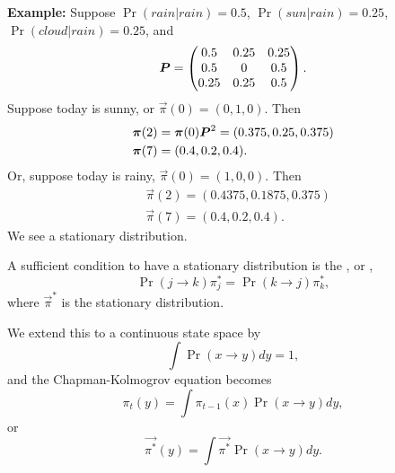 \documentclass[thesis.tex]{subfiles}
\begin{document}
\noindent\textbf{Example:} Suppose \(\Pr(rain | rain) = 0.5\), \(\Pr(sun | rain) = 0.25\), \(\Pr(cloud | rain) = 0.25\), and \[
	\boldsymbol{P} = \begin{pmatrix}
		0.5 & 0.25 & 0.25 \\
		0.5 & 0 & 0.5 \\
		0.25 & 0.25 & 0.5
	\end{pmatrix}.
\] Suppose today is sunny, or \(\vec{\pi}(0) = (0, 1, 0)\). Then \begin{equation}\begin{aligned}
	&\boldsymbol{\pi}(2) = \boldsymbol{\pi}(0) \boldsymbol{P}^2 = (0.375, 0.25, 0.375) \\
	&\boldsymbol{\pi}(7) = (0.4, 0.2, 0.4).
\end{aligned}\end{equation} Or, suppose today is rainy, \(\vec{\pi}(0) = (1, 0, 0)\). Then \begin{equation}\begin{aligned}
	&\vec{\pi}(2) = (0.4375, 0.1875, 0.375) \\
	&\vec{\pi}(7) = (0.4, 0.2, 0.4).
\end{aligned}\end{equation} We see a stationary distribution.

\bigskip

\begin{comment}Also, a Markov chain is irreducible, aperiodic, and positive recurrent has a stationary distribution (prove?).
\end{comment}

A sufficient condition to have a stationary distribution is the , or , \[
	\Pr(j \to k)\pi_j^* = \Pr(k \to j)\pi_k^*,
\] where \(\vec{\pi}^*\) is the stationary distribution.

\begin{comment}
	\textbf{Claim:} \(\vec{\pi} = \vec{\pi}\mat{P}\).
\end{comment}

We extend this to a continuous state space by \[
	\int \Pr(x \to y) dy = 1,
\] and the Chapman-Kolmogrov equation becomes \[
	\pi_t(y) = \int \pi_{t-1}(x)\Pr(x \to y) dy,
\] or \[
	\vec{\pi^*}(y) = \int \vec{\pi^*} \Pr(x \to y) dy.
\]
\end{document}
